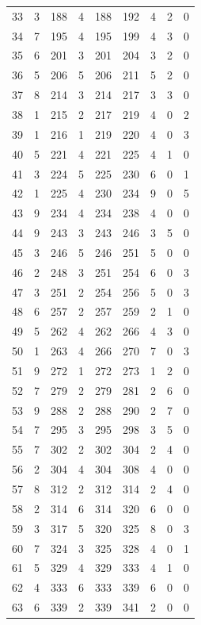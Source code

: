 \begin{longtable}{@{}rrrrrrrrr@{}}
33 & 3 & 188 & 4 & 188 & 192 & 4 & 2 & 0 \\
34 & 7 & 195 & 4 & 195 & 199 & 4 & 3 & 0 \\
35 & 6 & 201 & 3 & 201 & 204 & 3 & 2 & 0 \\
36 & 5 & 206 & 5 & 206 & 211 & 5 & 2 & 0 \\
37 & 8 & 214 & 3 & 214 & 217 & 3 & 3 & 0 \\
38 & 1 & 215 & 2 & 217 & 219 & 4 & 0 & 2 \\
39 & 1 & 216 & 1 & 219 & 220 & 4 & 0 & 3 \\
40 & 5 & 221 & 4 & 221 & 225 & 4 & 1 & 0 \\
41 & 3 & 224 & 5 & 225 & 230 & 6 & 0 & 1 \\
42 & 1 & 225 & 4 & 230 & 234 & 9 & 0 & 5 \\
43 & 9 & 234 & 4 & 234 & 238 & 4 & 0 & 0 \\
44 & 9 & 243 & 3 & 243 & 246 & 3 & 5 & 0 \\
45 & 3 & 246 & 5 & 246 & 251 & 5 & 0 & 0 \\
46 & 2 & 248 & 3 & 251 & 254 & 6 & 0 & 3 \\
47 & 3 & 251 & 2 & 254 & 256 & 5 & 0 & 3 \\
48 & 6 & 257 & 2 & 257 & 259 & 2 & 1 & 0 \\
49 & 5 & 262 & 4 & 262 & 266 & 4 & 3 & 0 \\
50 & 1 & 263 & 4 & 266 & 270 & 7 & 0 & 3 \\
51 & 9 & 272 & 1 & 272 & 273 & 1 & 2 & 0 \\
52 & 7 & 279 & 2 & 279 & 281 & 2 & 6 & 0 \\
53 & 9 & 288 & 2 & 288 & 290 & 2 & 7 & 0 \\
54 & 7 & 295 & 3 & 295 & 298 & 3 & 5 & 0 \\
55 & 7 & 302 & 2 & 302 & 304 & 2 & 4 & 0 \\
56 & 2 & 304 & 4 & 304 & 308 & 4 & 0 & 0 \\
57 & 8 & 312 & 2 & 312 & 314 & 2 & 4 & 0 \\
58 & 2 & 314 & 6 & 314 & 320 & 6 & 0 & 0 \\
59 & 3 & 317 & 5 & 320 & 325 & 8 & 0 & 3 \\
60 & 7 & 324 & 3 & 325 & 328 & 4 & 0 & 1 \\
61 & 5 & 329 & 4 & 329 & 333 & 4 & 1 & 0 \\
62 & 4 & 333 & 6 & 333 & 339 & 6 & 0 & 0 \\
63 & 6 & 339 & 2 & 339 & 341 & 2 & 0 & 0 \\

\end{longtable}
